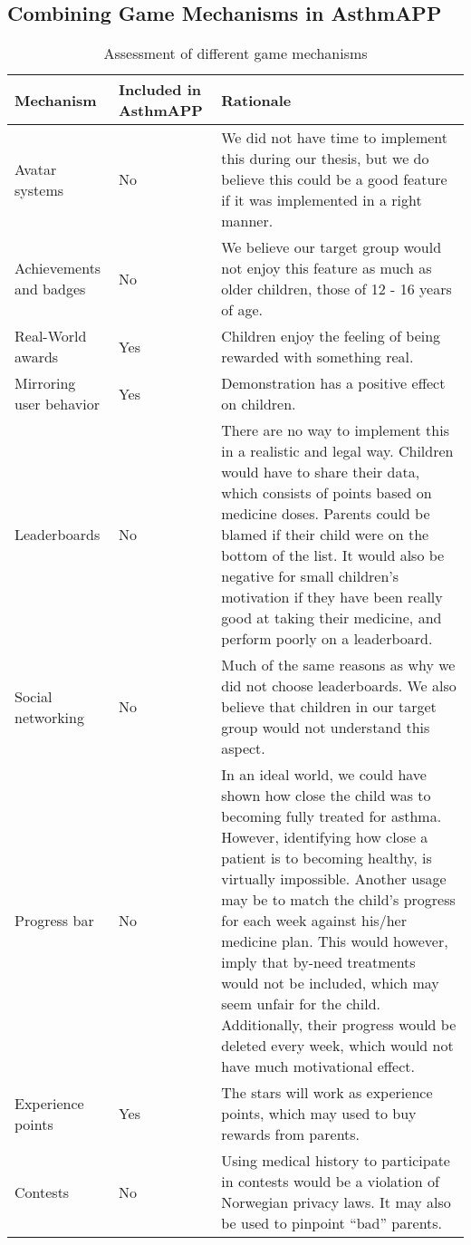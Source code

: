 \subsection{Combining Game Mechanisms in AsthmAPP}
\begin{table}[H]
\begin{tabular}{| p{2.5cm} | p{2.0cm} | p{9.5cm} | }
	\hline
	\textbf{Mechanism} & \textbf{Included in AsthmAPP} & \textbf{Rationale} \\
	\hline
	Avatar systems & No & We did not have time to implement this during our thesis, but we do believe this could be a good feature if it was implemented in a right manner.    
	 \\
	\hline
	Achievements and badges & No & We believe our target group would not enjoy this feature as much as older children, those of 12 - 16 years of age.  \\
	\hline 
	Real-World awards & Yes & Children enjoy the feeling of being rewarded with something real.
	 \\
	\hline
	Mirroring user behavior & Yes & Demonstration has a positive effect on children.
	\\
	\hline
	Leaderboards & No & There are no way to implement this in a realistic and legal way. Children would have to share their data, which consists of points based on medicine doses. Parents could be blamed if their child were on the bottom of the list. It would also be negative for small children's motivation if they have been really good at taking their medicine, and perform poorly on a leaderboard. 
	\\
	\hline
	Social networking & No & Much of the same reasons as why we did not choose leaderboards. We also believe that children in our target group would not understand this aspect.  
	\\
	\hline
	Progress bar & No & In an ideal world, we could have shown how close the child was to becoming fully treated for asthma. However, identifying how close a patient is to becoming healthy, is virtually impossible. Another usage may be to match the child's progress for each week against his/her medicine plan. This would however, imply that by-need treatments would not be included, which may seem unfair for the child. Additionally, their progress would be deleted every week, which would not have much motivational effect.  
	\\
	\hline
	Experience points & Yes & The stars will work as experience points, which may used to buy rewards from parents. 
	\\
	\hline
	Contests & No & Using medical history to participate in contests would be a violation of Norwegian privacy laws. It may also be used to pinpoint ``bad'' parents.      
	\\
	\hline
\end{tabular}
\caption{Assessment of different game mechanisms}
\label{tab:game-mech-in-astmapp}
\end{table}


